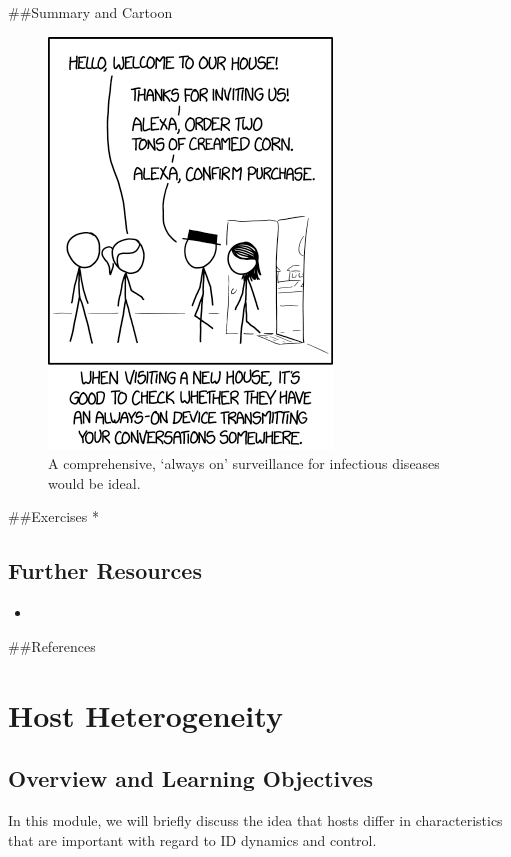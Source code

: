 \documentclass[]{book}
\theoremstyle{definition}
\theoremstyle{definition}
\theoremstyle{definition}
\theoremstyle{remark}
\begin{document}
\#\#Summary and Cartoon

\begin{figure}
\centering
\includegraphics{./images/xkcd-listening.png}
\caption{A comprehensive, `always on' surveillance for infectious
diseases would be ideal.}
\end{figure}

\#\#Exercises *

\hypertarget{further-resources-3}{%
\section{Further Resources}\label{further-resources-3}}

\begin{itemize}
\item
\end{itemize}

\#\#References

\hypertarget{heterogeneity}{%
\chapter{Host Heterogeneity}\label{heterogeneity}}

\hypertarget{overview-and-learning-objectives-10}{%
\section{Overview and Learning
Objectives}\label{overview-and-learning-objectives-10}}

In this module, we will briefly discuss the idea that hosts differ in
characteristics that are important with regard to ID dynamics and
control.
\end{document}
